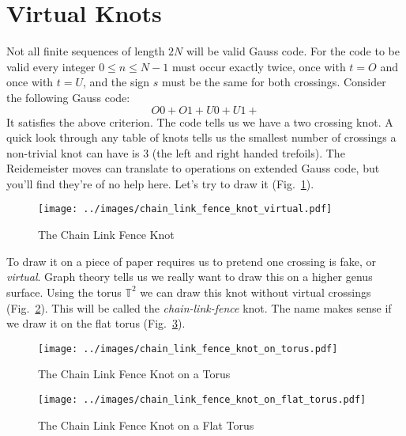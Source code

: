 \documentclass{article}
\theoremstyle{plain}
\begin{document}
    \section{Virtual Knots}
        Not all finite sequences of length $2N$ will be valid Gauss code. For
        the code to be valid every integer $0\leq{n}\leq{N-1}$ must occur
        exactly twice, once with $t=O$ and once with $t=U$, and the sign
        $s$ must be the same for both crossings. Consider the following Gauss
        code:
        \begin{equation}
            O0+O1+U0+U1+
        \end{equation}
        It satisfies the above criterion.
        The code tells us we have a two crossing knot. A quick look through any
        table of knots tells us the smallest number of crossings a non-trivial
        knot can have is 3 (the left and right handed trefoils). The
        Reidemeister moves can translate to operations on extended Gauss code,
        but you'll find they're of no help here. Let's try to draw it
        (Fig.~\ref{fig:chain_link_fence_knot}).
        \begin{figure}
            \centering
            \texttt{[image: ../images/chain\_link\_fence\_knot\_virtual.pdf]}
            \caption{The Chain Link Fence Knot}
            \label{fig:chain_link_fence_knot}
        \end{figure}
        To draw it on a piece of paper requires us to pretend one crossing is
        fake, or \textit{virtual}. Graph theory tells us we really want to draw
        this on a higher genus surface. Using the torus $\mathbb{T}^{2}$ we can
        draw this knot without virtual crossings
        (Fig.~\ref{fig:chain_link_fence_knot_on_torus}). This will be called
        the \textit{chain-link-fence} knot. The name makes sense if we draw it
        on the flat torus (Fig.~\ref{fig:chain_link_fence_knot_on_flat_torus}).
        \begin{figure}
            \centering
            \texttt{[image: ../images/chain\_link\_fence\_knot\_on\_torus.pdf]}
            \caption{The Chain Link Fence Knot on a Torus}
            \label{fig:chain_link_fence_knot_on_torus}
        \end{figure}
        \begin{figure}
            \centering
            \texttt{[image: ../images/chain\_link\_fence\_knot\_on\_flat\_torus.pdf]}
            \caption{The Chain Link Fence Knot on a Flat Torus}
            \label{fig:chain_link_fence_knot_on_flat_torus}
        \end{figure}
\end{document}
